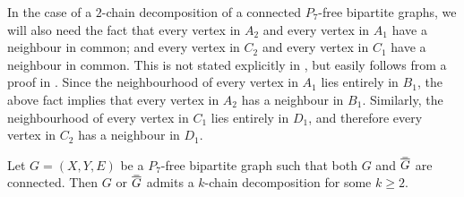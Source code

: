 \documentclass{theoretics}
\newcommand\doverline[1]{%
  \setbox0=\hbox{$\!\overline{#1}\!$}%
  \ht0=\dimexpr\ht0-.2ex\relax%
  \,\overline{\copy0}\,%
}
\newcommand{\bc}[1]{\doverline{#1}} %
\begin{document}
\begin{remark}
\label{rem:2-chain decomp}
In the case of a $2$-chain decomposition of a connected $P_7$-free bipartite graphs, we will also
need the fact that every vertex in $A_2$ and every vertex in $A_1$ have a neighbour in common; and
every vertex in $C_2$ and every vertex in $C_1$ have a neighbour in common. This is not stated
explicitly in \cite{LZ17}, but easily follows from a proof in \cite{LZ17}.
Since the neighbourhood of every vertex in $A_1$ lies entirely in $B_1$, the above fact implies
that every vertex in $A_2$ has a neighbour in $B_1$. Similarly, the neighbourhood of every vertex in
$C_1$ lies entirely in $D_1$, and therefore every vertex in $C_2$ has a neighbour in $D_1$.
\end{remark}


\begin{theorem}[\cite{LZ17}]\label{thm:P7_chain_dec}
	Let $G=(X,Y,E)$ be a $P_7$-free bipartite graph such that both $G$ and $\bc{G}$ are connected.
	Then $G$ or $\bc{G}$ admits a $k$-chain decomposition for some $k \geq 2$. 
\end{theorem}
\end{document}
